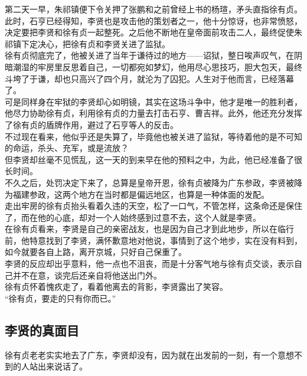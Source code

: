 \begin{multicols}{\theparacolNo}
第二天一早，朱祁镇便下令关押了张鹏和之前曾经上书的杨瑄，矛头直指徐有贞。\\

此时，石亨已经得知，李贤也是攻击他的策划者之一，他十分惊讶，也非常愤怒，决定要把李贤和徐有贞一起整死。之后他不断地在皇帝面前攻击二人，最终促使朱祁镇下定决心，把徐有贞和李贤关进了监狱。\\

徐有贞彻底完了，他被关进了当年于谦待过的地方——诏狱，整日唉声叹气，在阴暗潮湿的牢房里反思着自己，一切都宛如梦幻，他用尽心思技巧，胆大包天，最终斗垮了于谦，却也只高兴了四个月，就沦为了囚犯。人生对于他而言，已经落幕了。\\

可是同样身在牢狱的李贤却心如明镜，其实在这场斗争中，他才是唯一的胜利者，他尽力协助徐有贞，利用徐有贞的力量去打击石亨、曹吉祥。此外，他还充分发挥了徐有贞的盾牌作用，避过了石亨等人的反击。\\

不过现在看来，他似乎还是失算了，毕竟他也被关进了监狱，等待着他的是不可知的命运，杀头、充军，或是流放？\\

但李贤却丝毫不见慌乱，这一天的到来早在他的预料之中，为此，他已经准备了很长时间。\\

不久之后，处罚决定下来了，总算是皇帝开恩，徐有贞被降为广东参政，李贤被降为福建参政，这两个地方在当时都是偏远地区，也算是一种体面的发配。\\

走出牢房的徐有贞抬头看着久违的天空，松了一口气，不管怎样，这条命还是保住了，而在他的心底，却对一个人始终感到过意不去，这个人就是李贤。\\

在徐有贞看来，李贤是自己的亲密战友，也是因为自己才到此地步，所以在临行前，他特意找到了李贤，满怀歉意地对他说，事情到了这个地步，实在没有料到，如今就要各自上路，离开京城，只好自己保重了。\\

李贤的反应却出乎意料，他一点也不沮丧，而是十分客气地与徐有贞交谈，表示自己并不在意，谈完后还亲自将他送出门外。\\

徐有贞怀着愧疚走了，看着他离去的背影，李贤露出了笑容。\\

“徐有贞，要走的只有你而已。”\\

\subsection{李贤的真面目}
徐有贞老老实实地去了广东，李贤却没有，因为就在出发前的一刻，有一个意想不到的人站出来说话了。\\


\end{multicols}
